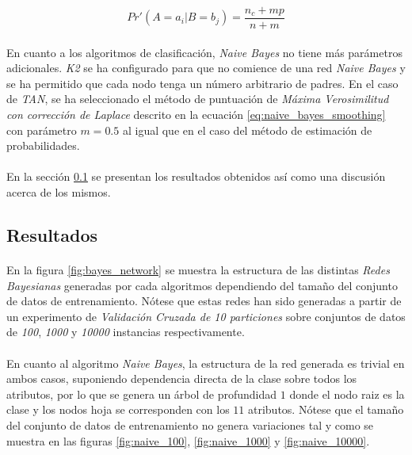 \documentclass{article}
\begin{document}
			\begin{equation}
			\label{eq:naive_bayes_smoothing}
			 Pr'(A = a_i | B = b_j) = \frac{n_c + mp}{n + m}
			\end{equation}

			\paragraph{}
			En cuanto a los algoritmos de clasificación, \emph{Naive Bayes} no tiene más parámetros adicionales. \emph{K2} se ha configurado para que no comience de una red \emph{Naive Bayes} y se ha permitido que cada nodo tenga un número arbitrario de padres. En el caso de \emph{TAN}, se ha seleccionado el método de puntuación de \emph{Máxima Verosimilitud con corrección de Laplace} descrito en la ecuación \eqref{eq:naive_bayes_smoothing} con parámetro $m = 0.5$ al igual que en el caso del método de estimación de probabilidades.

		\paragraph{}
		En la sección \ref{sec:results} se presentan los resultados obtenidos así como una discusión acerca de los mismos.

		\subsection{Resultados}
		\label{sec:results}

			\paragraph{}
			En la figura \ref{fig:bayes_network} se muestra la estructura de las distintas \emph{Redes Bayesianas} generadas por cada algoritmos dependiendo del tamaño del conjunto de datos de entrenamiento. Nótese que estas redes han sido generadas a partir de un experimento de \emph{Validación Cruzada de 10 particiones} sobre conjuntos de datos de \emph{100}, \emph{1000} y \emph{10000} instancias respectivamente.

			\paragraph{}
			En cuanto al algoritmo \emph{Naive Bayes}, la estructura de la red generada es trivial en ambos casos, suponiendo dependencia directa de la clase sobre todos los atributos, por lo que se genera un árbol de profundidad $1$ donde el nodo raiz es la clase y los nodos hoja se corresponden con los $11$ atributos. Nótese que el tamaño del conjunto de datos de entrenamiento no genera variaciones tal y como se muestra en las figuras \ref{fig:naive_100}, \ref{fig:naive_1000} y \ref{fig:naive_10000}.
\end{document}
